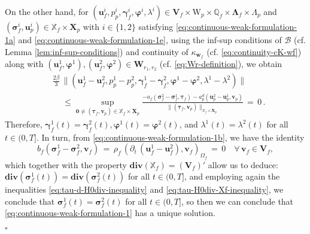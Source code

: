 \documentclass[11pt]{article}
\numberwithin{equation}{section}
\newcommand{\ds}{\displaystyle}
\newcommand{\bgamma}{{\boldsymbol\gamma}}
\newcommand{\bLambda}{{\boldsymbol\Lambda}}
\newcommand{\bsi}{{\boldsymbol\sigma}}
\newcommand{\bvarphi}{{\boldsymbol\varphi}}
\newcommand{\btau}{{\boldsymbol\tau}}
\newcommand{\bv}{{\mathbf{v}}}
\newcommand{\bw}{{\mathbf{w}}}
\newcommand{\bu}{\mathbf{u}}
\newcommand{\bn}{{\mathbf{n}}}
\newcommand{\0}{{\mathbf{0}}}
\def\bK{\mathbf{K}}
\def\bX{\mathbf{X}}
\def\bV{\mathbf{V}}
\def\bW{\mathbf{W}}
\newcommand\bbQ{\mathbb{Q}}
\newcommand\bbX{\mathbb{X}}
\newcommand{\cB}{\mathcal{B}}
\def\W{\mathrm{W}}
\def\rd{\mathrm{d}}
\def\bdiv{\mathbf{div}}
\def\div{\mathrm{div}}
\def\pil{\left<}
\def\pir{\right>}
\newenvironment{proof}{\noindent{\it Proof.}}{\hfill$\square$}
\numberwithin{equation}{section}
\begin{document}
\begin{proof}
On the other hand, for $(\bu^i_f, p^i_p, \bgamma^i_f, \bvarphi^i, \lambda^i) \in \bV_f\times \W_p\times \bbQ_f\times \bLambda_f\times \Lambda_p$ and $(\bsi^i_f, \bu^i_p) \in \bbX_f\times \bX_p$  with $i\in \{1,2\}$ satisfying \eqref{eq:continuous-weak-formulation-1a} and \eqref{eq:continuous-weak-formulation-1e}, using the inf-sup conditions of $\cB$ (cf. Lemma \ref{lem:inf-sup-conditions}) and continuity of $\kappa_{\bw_f}$ (cf. \eqref{eq:continuity-cK-wf}) along with $(\bu^1_f,\bvarphi^1), (\bu^2_f,\bvarphi^2)\in \bW_{r_1,r_2}$ (cf. \eqref{eq:Wr-definition}), we obtain
\begin{align*}
& \frac{2\beta}{3}\,\|(\bu^1_f - \bu^2_f, p^1_p - p^2_p, \bgamma^1_f - \bgamma^2_f, \bvarphi^1 - \bvarphi^2, \lambda^1 - \lambda^2)\| \nonumber\\
& \quad \,\leq \sup_{\0\neq (\btau_f,\bv_p)\in \bbX_{f}\times \bX_p}   \frac{-a_f(\bsi^2_f - \bsi^1_f,\btau_f) - a^d_p(\bu^2_p - \bu^1_p,\bv_p)}{\|(\btau_f,\bv_p)\|_{\bbX_f\times \bX_p}} \,=\, 0 \,.
\end{align*}
Therefore, $\bgamma^1_f(t) = \bgamma^2_f(t), \bvarphi^1(t) = \bvarphi^2(t)$, and $\lambda^1(t) = \lambda^2(t)$ for all $t\in (0,T]$.
In turn, from \eqref{eq:continuous-weak-formulation-1b}, we have the identity
\begin{equation*}
b_f(\bsi^1_f - \bsi^2_f,\bv_f)  
\,=\, \rho_f\,(\partial_t\,(\bu^1_f - \bu^2_f),\bv_f)_{\Omega_f} 
\,=\, 0 \quad \forall\,\bv_f\in \bV_f, 
\end{equation*}
which together with the property $\bdiv(\bbX_f) = (\bV_f)'$ allow us to deduce: $\bdiv(\bsi^1_f(t)) = \bdiv(\bsi^2_f(t))$ for all $t\in (0,T]$, and employing again the inequalities \eqref{eq:tau-d-H0div-inequality} and \eqref{eq:tau-H0div-Xf-inequality}, we conclude that $\bsi^1_f(t) = \bsi^2_f(t)$ for all $t\in (0,T]$, so then we can conclude that \eqref{eq:continuous-weak-formulation-1} has a unique solution.


\end{proof}
\end{document}

